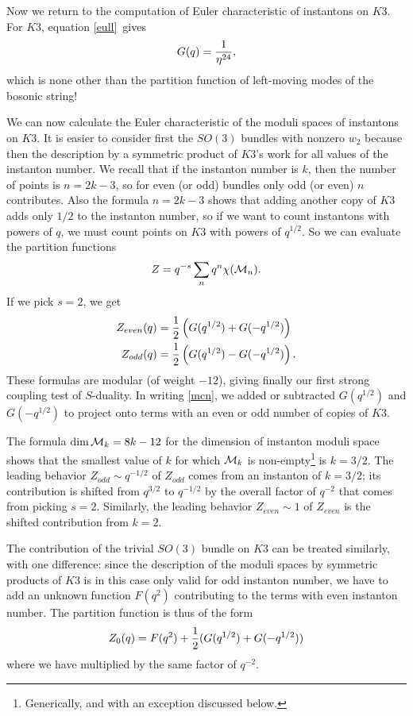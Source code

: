 \documentclass[12pt]{article}
\numberwithin{equation}{section}
\begin{document}
\bigskip
{}

Now we return to the computation of Euler characteristic of
instantons on $K3$.  For $K3$, equation \eqref{eull}\ gives
%
$$G(q)={1\over \eta^{24}},$$
%
which is none other than the partition function of left-moving modes
of the bosonic string!

We can now calculate the Euler characteristic of the moduli
spaces of instantons on $K3$.
It is easier to consider first the $SO(3)$ bundles with nonzero
$w_2$ because then the description by a symmetric product
of $K3$'s work for all values of the instanton number.
We recall that if the instanton number is $k$, then the number
of points is $n=2k-3$, so for even (or odd) bundles only
odd (or even) $n$ contributes.
Also the formula $n=2k-3$ shows that adding another copy of $K3$
adds only $1/2$ to the instanton number, so if we want to count
instantons with powers of $q$, we must count points on $K3$ with
powers of $q^{1/2}$.
So we can evaluate the partition functions
\begin{equation}
  \label{dns}
  Z=q^{-s}\sum_{n}q^n\chi({\cal M}_n).
\end{equation}
If we pick $s=2$, we get
\begin{equation}
  \label{mcn}
  \begin{aligned}Z_{even}(q)&={1\over 2}\left(G(q^{1/2})+G(-q^{1/2})
    \right)\\ Z_{odd}(q)&={1\over 2}\left(G(q^{1/2})-G(-q^{1/2})\right).\\
  \end{aligned}
\end{equation}
%
These formulas are modular (of weight $-12$),
giving finally our first strong coupling test of
$S$-duality.  In writing \eqref{mcn}, we added or subtracted
$G(q^{1/2})$ and $G(-q^{1/2})$ to project onto terms with an even or
odd number of copies of $K3$.

The formula $\dim{\cal M}_k=8k-12$ for the dimension of instanton
moduli space shows that the smallest value of $k$ for which ${\cal M}_k$
is non-empty\footnote{Generically, and with an exception discussed below.}
is $k=3/2$.  The leading behavior
$Z_{odd}\sim q^{-1/2}$ of $Z_{odd}$ comes from an instanton of $k=3/2$;
its contribution is shifted from $q^{3/2}$ to $q^{-1/2}$ by the overall
factor of $q^{-2}$ that comes from picking $s=2$.
Similarly, the leading behavior $Z_{even}\sim 1$
of $Z_{even}$ is the shifted contribution from $k=2$.

The contribution of the trivial $SO(3)$ bundle on $K3$ can be treated
similarly, with one difference: since the description of the moduli
spaces by symmetric products of $K3$ is in this case only valid for
odd instanton number, we have to add an unknown function $F(q^2)$
contributing to the terms with even instanton number.
The partition function is thus of the form
%
\begin{equation}
  \label{kthr}
  Z_{0}(q)=F(q^2)+{1\over 2}(G(q^{1/2})+G(-q^{1/2}))
\end{equation}
%
where we have multiplied by the same factor of $q^{-2}$.
\end{document}
